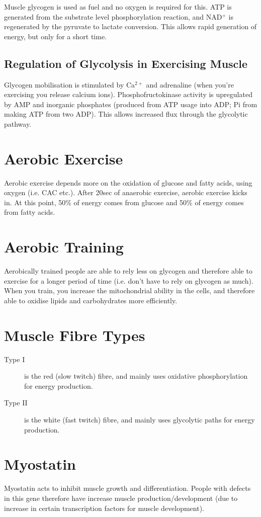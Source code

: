 Muscle glycogen is used as fuel and no oxygen is required for this.
ATP is generated from the substrate level phosphorylation reaction, and NAD$^+$ is regenerated by the pyruvate to lactate conversion.
This allows rapid generation of energy, but only for a short time.

\subsection{Regulation of Glycolysis in Exercising Muscle}

Glycogen mobilisation is stimulated by Ca$^{2+}$ and adrenaline (when you're exercising you release calcium ions).
Phosphofructokinase activity is upregulated by AMP and inorganic phosphates (produced from ATP usage into ADP; Pi from making ATP from two ADP).
This allows increased flux through the glycolytic pathway.

\section{Aerobic Exercise}

Aerobic exercise depends more on the oxidation of glucose and fatty acids, using oxygen (i.e. CAC etc.).
After 20sec of anaerobic exercise, aerobic exercise kicks in.
At this point, 50\% of energy comes from glucose and 50\% of energy comes from fatty acids.

\begin{center}
\end{center}

\section{Aerobic Training}

Aerobically trained people are able to rely less on glycogen and therefore able to exercise for a longer period of time (i.e. don't have to rely on glycogen as much).
When you train, you increase the mitochondrial ability in the cells, and therefore able to oxidise lipids and carbohydrates more efficiently.

\section{Muscle Fibre Types}

\begin{description}
\item[Type I] is the red (slow twitch) fibre, and mainly uses oxidative phosphorylation for energy production.
\item[Type II] is the white (fast twitch) fibre, and mainly uses glycolytic paths for energy production.
\end{description}

\section{Myostatin}

Myostatin acts to inhibit muscle growth and differentiation.
People with defects in this gene therefore have increase muscle production/development (due to increase in certain transcription factors for muscle development).

